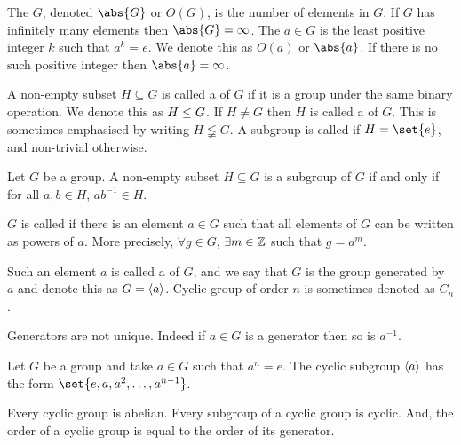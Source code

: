 \documentclass[11pt]{penrose}
\begin{document}
\begin{ndfn}
    The  $G$, denoted $\abs{G}$ or $O(G)$, is the number of elements in $G$. If $G$ has infinitely many elements then $\abs{G} = \infty$. The  $a \in G$ is the least positive integer $k$ such that $a^k = e$. We denote this as $O(a)$ or $\abs{a}$. If there is no such positive integer then $\abs{a} = \infty$.
\end{ndfn}

\begin{ndfn}[Subgroup]
    A non-empty subset $H \subseteq G$ is called a  of $G$ if it is a group under the same binary operation. We denote this as $H \mathrel{\leq} G$. If $H \neq G$ then $H$ is called a  of $G$. This is sometimes emphasised by writing $H \lneqq G$. A subgroup is called  if $H = \set{e}$, and non-trivial otherwise.
\end{ndfn}

\begin{nthm}
    Let $G$ be a group. A non-empty subset $H \subseteq G$ is a subgroup of $G$ if and only if for all $a, b \in H$, $ab^{-1} \in H$.
\end{nthm}

\begin{ndfn}
    $G$ is called  if there is an element $a \in G$ such that all elements of $G$ can be written as powers of $a$. More precisely, $\forall g \in G$, $\exists m \in \mathbb{Z}$ such that $g = a^m$.

    Such an element $a$ is called a  of $G$, and we say that $G$ is the group generated by $a$ and denote this as $G = \langle a\rangle$. Cyclic group of order $n$ is sometimes denoted as $C_n$.
\end{ndfn}

Generators are not unique. Indeed if $a \in G$ is a generator then so is $a^{-1}$.

\begin{nthm}
    Let $G$ be a group and take $a \in G$ such that $a^n = e$. The cyclic subgroup $\langle a\rangle$ has the form $\set{e, a, a^2, \dots, a^{n-1}}$.
\end{nthm}

\begin{nthm}
    Every cyclic group is abelian. Every subgroup of a cyclic group is cyclic. And, the order of a cyclic group is equal to the order of its generator.
\end{nthm}
\end{document}
